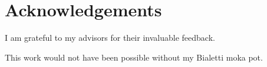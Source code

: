 \section*{Acknowledgements}

\noindent I am grateful to my advisors for their invaluable feedback.
\vspace{0.5cm}

\noindent This work would not have been possible without my Bialetti moka pot.
